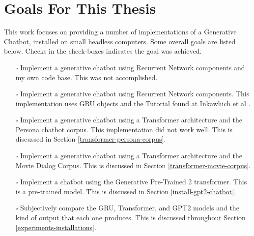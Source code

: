 
\section{Goals For This Thesis}
This work focuses on providing a number of implementations of a Generative Chatbot, installed on small headless computers. Some overall goals are listed below. Checks in the check-boxes indicates the goal was achieved.

\begin{itemize}
	\item[\rlap{\raisebox{0.3ex}{\hspace{0.4ex}\scriptsize \ding{56}}}$\square$] Implement a generative chatbot using Recurrent Network components and my own code base. This was not accomplished.
	
	\item[\rlap{\raisebox{0.3ex}{\hspace{0.4ex}\tiny \ding{52}}}$\square$] Implement a generative chatbot using Recurrent Network components. This implementation uses GRU objects and the Tutorial found at Inkawhich et al \cite{2018Inkawhich}.
	
	\item[\rlap{\raisebox{0.3ex}{\hspace{0.4ex}\scriptsize \ding{56}}}$\square$] Implement a generative chatbot using a Transformer architecture and the Persona chatbot corpus. This implementation did not work well. This is discussed in Section \ref{transformer-persona-corpus}. %
	
	\item[\rlap{\raisebox{0.3ex}{\hspace{0.4ex}\tiny \ding{52}}}$\square$] Implement a generative chatbot using a Transformer architecture and the Movie Dialog Corpus. This is discussed in Section \ref{transformer-movie-corpus}. %
	
	\item[\rlap{\raisebox{0.3ex}{\hspace{0.4ex}\tiny \ding{52}}}$\square$] Implement a chatbot using the Generative Pre-Trained 2 transformer. This is a pre-trained model. This is discussed in Section \ref{install-gpt2-chatbot}.
	
	\item[\rlap{\raisebox{0.3ex}{\hspace{0.4ex}\tiny \ding{52}}}$\square$] Subjectively compare the GRU, Transformer, and GPT2 models and the kind of output that each one produces. This is discussed throughout Section \ref{experiments-installations}.
	

\end{itemize}
